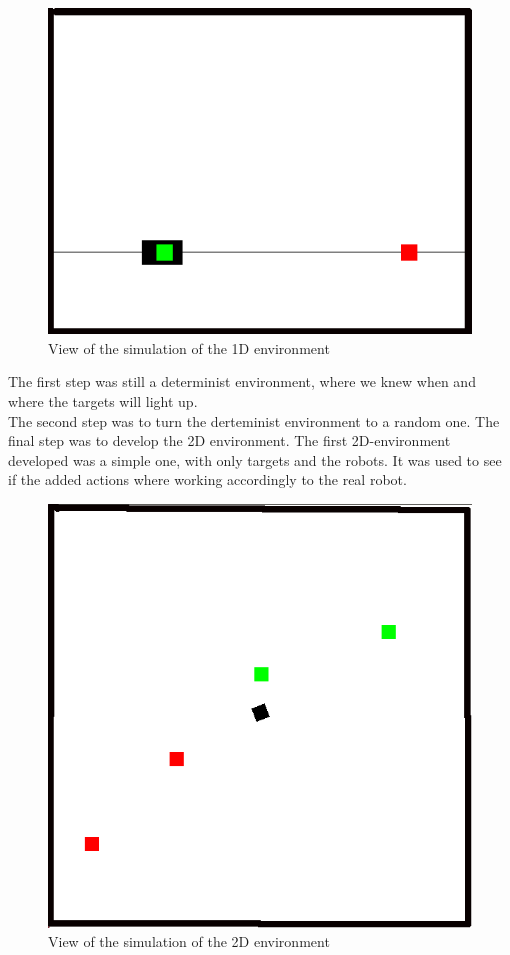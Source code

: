 \documentclass[conference]{IEEEtran}
\begin{document}
\begin{figure}
  \includegraphics[scale = 0.4]{images/1Dsimple.png}
  \caption{View of the simulation of the 1D environment}
  \label{fig:my-figure}
\end{figure}

The first step was still a determinist environment, where we knew when and where the targets will light up.\\
The second step was to turn the derteminist environment to a random one.
The final step was to develop the 2D environment. The first 2D-environment developed was a simple one, with only targets and the robots. It was used to see if the added actions where working accordingly to the real robot.\\

\begin{figure}
  \includegraphics[scale = 0.35]{images/2Dsimple.png}
  \caption{View of the simulation of the 2D environment}
  \label{fig:my-figure}
\end{figure}
\end{document}
